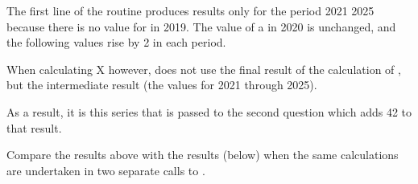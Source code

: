 \documentclass[letterpaper,10pt,english]{jupyterBook}
\begin{document}
\sphinxAtStartPar
The first line of the  routine produces results only for the period 2021 \sphinxhyphen{} 2025 because there is no value for  in 2019.  The value of a in 2020 is unchanged, and the following values rise by 2 in each period.

\sphinxAtStartPar
When calculating X however,  does not use the final result of the calculation of , but the intermediate result (the values for 2021 through 2025).

\sphinxAtStartPar
As a result, it is this series that is passed to the second question which adds 42 to that result.

\sphinxAtStartPar
{}

\sphinxAtStartPar
Compare the results above with the results (below) when the same calculations are undertaken in two separate calls to .
\end{document}
